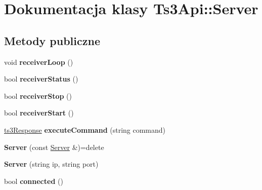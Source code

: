 \hypertarget{class_ts3_api_1_1_server}{}\section{Dokumentacja klasy Ts3\+Api\+:\+:Server}
\label{class_ts3_api_1_1_server}
\subsection*{Metody publiczne}
\begin{DoxyCompactItemize}
\item 
void {\bfseries receiver\+Loop} ()\hypertarget{class_ts3_api_1_1_server_a7548a556a03580a1020766212d44517c}{}\label{class_ts3_api_1_1_server_a7548a556a03580a1020766212d44517c}

\item 
bool {\bfseries receiver\+Status} ()\hypertarget{class_ts3_api_1_1_server_a2b21836416769a10006d9e2ef8bfaa74}{}\label{class_ts3_api_1_1_server_a2b21836416769a10006d9e2ef8bfaa74}

\item 
bool {\bfseries receiver\+Stop} ()\hypertarget{class_ts3_api_1_1_server_adc67fafeac60231d2c979ec16e3f93ae}{}\label{class_ts3_api_1_1_server_adc67fafeac60231d2c979ec16e3f93ae}

\item 
bool {\bfseries receiver\+Start} ()\hypertarget{class_ts3_api_1_1_server_a75c4a1c7de79ac2a444d2880208af2e9}{}\label{class_ts3_api_1_1_server_a75c4a1c7de79ac2a444d2880208af2e9}

\item 
\hyperlink{struct_ts3_api_1_1ts3_response}{ts3\+Response} {\bfseries execute\+Command} (string command)\hypertarget{class_ts3_api_1_1_server_a3ea16dc4a1a611c444c17b0be04d4f45}{}\label{class_ts3_api_1_1_server_a3ea16dc4a1a611c444c17b0be04d4f45}

\item 
{\bfseries Server} (const \hyperlink{class_ts3_api_1_1_server}{Server} \&)=delete\hypertarget{class_ts3_api_1_1_server_a8c64ad5021d8978a6cb3ed767b709429}{}\label{class_ts3_api_1_1_server_a8c64ad5021d8978a6cb3ed767b709429}

\item 
{\bfseries Server} (string ip, string port)\hypertarget{class_ts3_api_1_1_server_a58ee97b7e2b067978cbcdb8a594687f2}{}\label{class_ts3_api_1_1_server_a58ee97b7e2b067978cbcdb8a594687f2}

\item 
bool {\bfseries connected} ()\hypertarget{class_ts3_api_1_1_server_a947c45de5db2315434a42db1bf024c4c}{}\label{class_ts3_api_1_1_server_a947c45de5db2315434a42db1bf024c4c}


\end{DoxyCompactItemize}

